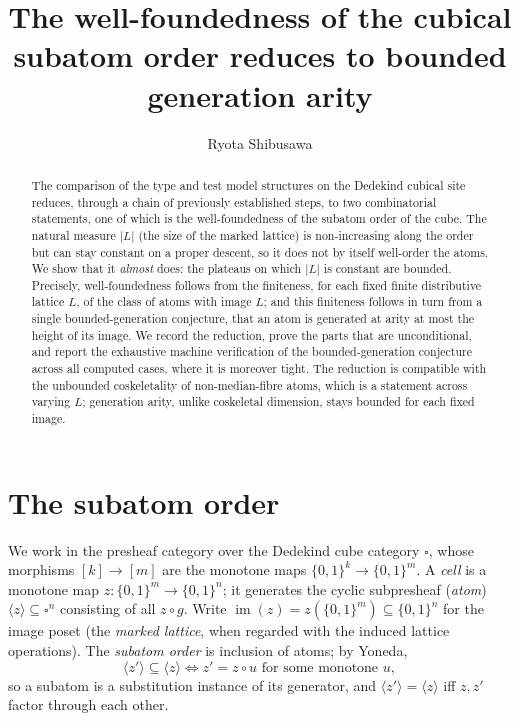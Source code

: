 \documentclass[11pt]{amsart}
\title[Well-foundedness of the cubical subatom order]
{The well-foundedness of the cubical subatom order reduces to
 bounded generation arity}
\author{Ryota Shibusawa}
\theoremstyle{plain}
\theoremstyle{definition}
\newcommand{\B}{\{0,1\}}
\newcommand{\im}{\operatorname{im}}
\newcommand{\cube}{\square}
\newcommand{\atom}[1]{\langle #1 \rangle}
\begin{document}
\begin{abstract}
  The comparison of the type and test model structures on the Dedekind
  cubical site reduces, through a chain of previously established
  steps, to two combinatorial statements, one of which is the
  well-foundedness of the subatom order of the cube.  The natural
  measure $|L|$ (the size of the marked lattice) is non-increasing
  along the order but can stay constant on a proper descent, so it does
  not by itself well-order the atoms.  We show that it \emph{almost}
  does: the plateaus on which $|L|$ is constant are bounded.  Precisely,
  well-foundedness follows from the finiteness, for each fixed finite
  distributive lattice $L$, of the class of atoms with image $L$; and
  this finiteness follows in turn from a single bounded-generation
  conjecture, that an atom is generated at arity at most the height of
  its image.  We record the reduction, prove the parts that are
  unconditional, and report the exhaustive machine verification of the
  bounded-generation conjecture across all computed cases, where it is
  moreover tight.  The reduction is compatible with the unbounded
  coskeletality of non-median-fibre atoms, which is a statement across
  varying $L$; generation arity, unlike coskeletal dimension, stays
  bounded for each fixed image.
\end{abstract}

\maketitle

\section{The subatom order}

We work in the presheaf category over the Dedekind cube category
$\cube$, whose morphisms $[k]\to[m]$ are the monotone maps
$\B^{k}\to\B^{m}$.  A \emph{cell} is a monotone map $z\colon\B^{m}\to
\B^{n}$; it generates the cyclic subpresheaf (\emph{atom})
$\atom{z}\subseteq\cube^{n}$ consisting of all $z\circ g$.  Write
$\im(z)=z(\B^{m})\subseteq\B^{n}$ for the image poset (the
\emph{marked lattice}, when regarded with the induced lattice
operations).  The \emph{subatom order} is inclusion of atoms; by
Yoneda,
\begin{equation}\label{eq:factor}
  \atom{z'}\subseteq\atom{z}
  \iff
  z'=z\circ u \text{ for some monotone } u,
\end{equation}
so a subatom is a substitution instance of its generator, and
$\atom{z'}=\atom{z}$ iff $z,z'$ factor through each other.
\end{document}

